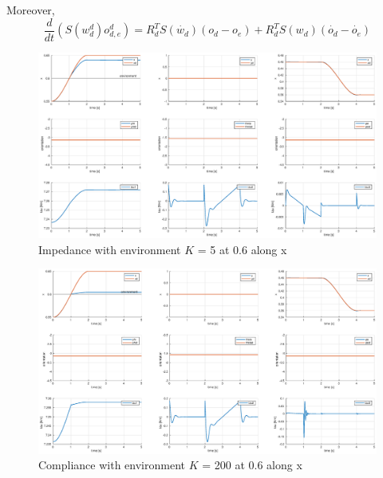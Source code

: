 \documentclass[a4paper,12pt]{article}
\begin{document}
Moreover,
\[
    \frac{d}{dt}\left(S(w_d^d)o_{d,e}^d \right)= R_d^TS(\dot{w_d})(o_d - o_e) + R_d^{T}S(w_d)(\dot{o_d} - \dot{o_e})
\]
\begin{figure}[H]
    \begin{center}
        \hspace*{-4.5cm}
        \includegraphics[scale=0.5]{images/impendance_soft.eps}
    \end{center}
    \caption{Impedance with environment $K$ = 5 at 0.6 along x}
    \label{fig:impedance_soft}
\end{figure}

\begin{figure}[H]
    \begin{center}
        \hspace*{-4.5cm}
        \includegraphics[scale=0.5]{images/impendance_stiff.eps}
    \end{center}
    \caption{Compliance with environment $K$ = 200 at 0.6 along x}
    \label{fig:impedance_stiff}
\end{figure}

\newpage
\end{document}
